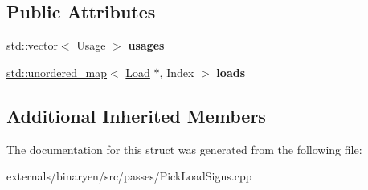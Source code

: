 \subsection*{Public Attributes}
\begin{DoxyCompactItemize}
\item 
\mbox{\label{structwasm_1_1_pick_load_signs_a80ecd381d4eb0e2158d18306d6c326c6}} 
\mbox{\hyperlink{classstd_1_1vector}{std\+::vector}}$<$ \mbox{\hyperlink{structwasm_1_1_pick_load_signs_1_1_usage}{Usage}} $>$ {\bfseries usages}
\item 
\mbox{\label{structwasm_1_1_pick_load_signs_a9c23fa8a7a64b8b028e196d17125b8cf}} 
\mbox{\hyperlink{classstd_1_1unordered__map}{std\+::unordered\+\_\+map}}$<$ \mbox{\hyperlink{classwasm_1_1_load}{Load}} $\ast$, Index $>$ {\bfseries loads}
\end{DoxyCompactItemize}
\subsection*{Additional Inherited Members}


The documentation for this struct was generated from the following file\+:\begin{DoxyCompactItemize}
\item 
externals/binaryen/src/passes/Pick\+Load\+Signs.\+cpp\end{DoxyCompactItemize}
